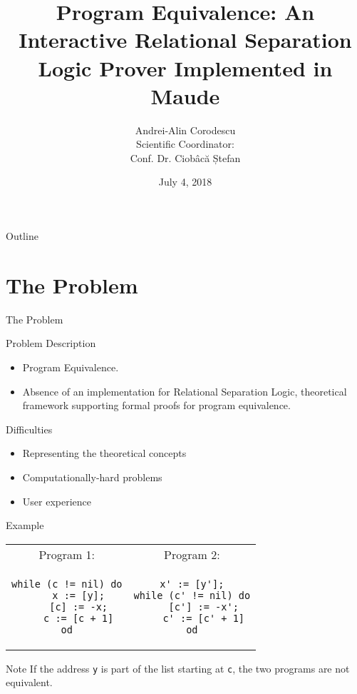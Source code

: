 \documentclass{beamer}
\title{Program Equivalence: An Interactive Relational Separation Logic Prover Implemented in Maude}
\author[Andrei-Alin Corodescu]{Andrei-Alin Corodescu \\ \vspace{1.5cm} Scientific Coordinator: \\ Conf. Dr. Ciobâcă Ștefan}
\institute[Alexandru Ioan Cuza University of Iași] %
\date{July 4, 2018}
\begin{document}
\begin{frame}
  \titlepage
\end{frame}

\begin{frame}{Outline}
  \tableofcontents
\end{frame}

\section{The Problem}

\begin{frame}{The Problem}
\begin{block}{Problem Description}
	\begin{itemize}
	\item Program Equivalence. 
	\item Absence of an implementation for Relational Separation Logic, theoretical framework supporting formal proofs for program equivalence.
	\end{itemize}
    \pause
\end{block}
	\begin{block}{Difficulties}
		\begin{itemize}
			\item Representing the theoretical concepts
			\item Computationally-hard problems
			\item User experience
		\end{itemize}
	\end{block}
\end{frame}

\begin{frame}[fragile]{Example}
\begin{center}
\begin{tabular*}{0.9\textwidth}{@{\extracolsep{\fill} } c  c }
	Program 1: \vspace{0.5cm} & Program 2: \vspace{0.5cm} \\
	\begin{lstlisting}
while (c != nil) do
	x := [y];
	[c] := -x;
	c := [c + 1]
od
	\end{lstlisting} &
	\begin{lstlisting}
x' := [y'];
while (c' != nil) do
	[c'] := -x';
	c' := [c' + 1]
od
	\end{lstlisting}

\end{tabular*}
	\begin{block}{Note}
	If the address \texttt{y} is part of the list starting at \texttt{c}, the two programs are \alert{not} equivalent.
\end{block}
\end{center}
\end{frame}
\end{document}
